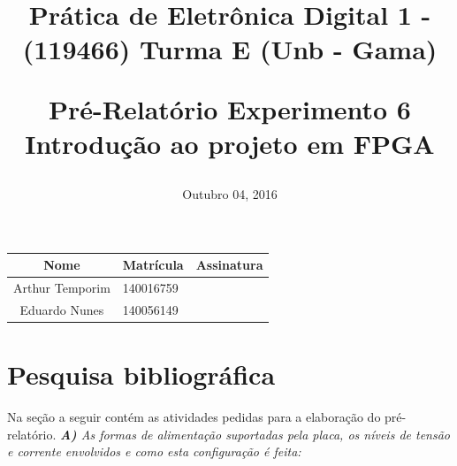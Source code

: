 \documentclass[12pts]{article}
\title{
	Prática de Eletrônica Digital 1 - (119466)
	\singlespacing
		Turma E (Unb - Gama)
	\singlespacing
	\begin{midpage}
	\begin {large}
		Pré-Relatório Experimento 6
		\singlespace
		Introdução ao projeto em FPGA
	\end {large}
	\end{midpage}
}
\date{Outubro 04, 2016}
\begin{document}
\maketitle	
\begin{center}

\begin{tabular}{|c|l|r|}
\hline
Nome & Matrícula & Assinatura\\
\hline
Arthur Temporim & 140016759 & \\
\hline	
Eduardo Nunes & 140056149 & \\
\hline	
\end{tabular}

\end{center}

\pagebreak

\section{Pesquisa bibliográfica}

	Na seção a seguir contém as atividades pedidas para a elaboração do pré-relatório.
\singlespacing
\textit{\textbf{A)} As formas de alimentação suportadas pela placa, os níveis de tensão e corrente envolvidos e como esta configuração é feita:}
\end{document}
